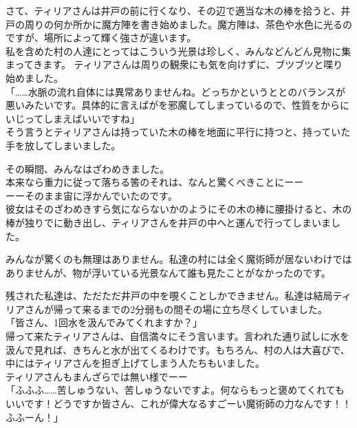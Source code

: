 \documentclass[oneside, a4paper]{jsbook}
\begin{document}
さて、ティリアさんは井戸の前に行くなり、その辺で適当な木の棒を拾うと、井戸の周りの何か所かに魔方陣を書き始めました。魔方陣は、茶色や水色に光るのですが、場所によって輝く強さが違います。\\
私を含めた村の人達にとってはこういう光景は珍しく、みんなどんどん見物に集まってきます。
ティリアさんは周りの観衆にも気を向けずに、ブツブツと喋り始めました。\\
  
 「……水脈の流れ自体には異常ありませんね。どっちかというととのバランスが悪いみたいです。具体的に言えばがを邪魔してしまっているので、性質をからにいじってしまえばいいですね」\\

そう言うとティリアさんは持っていた木の棒を地面に平行に持つと、持っていた手を放してしまいました。

その瞬間、みんなはざわめきました。\\
本来なら重力に従って落ちる筈のそれは、なんと驚くべきことにーー\\

ーーそのまま宙に浮かんでいたのです。\\

彼女はそのざわめきすら気にならないかのようにその木の棒に腰掛けると、木の棒が独りでに動き出し、ティリアさんを井戸の中へと運んで行ってしまいました。

みんなが驚くのも無理はありません。私達の村には全く魔術師が居ないわけではありませんが、物が浮いている光景なんて誰も見たことがなかったのです。

残された私達は、ただただ井戸の中を覗くことしかできません。私達は結局ティリアさんが帰って来るまでの2分弱もの間その場に立ち尽くしていました。\\

\noindent
「皆さん、1回水を汲んでみてくれますか？」\\

\noindent
帰って来たティリアさんは、自信満々にそう言います。言われた通り試しに水を汲んで見れば、きちんと水が出てくるわけです。もちろん、村の人は大喜びで、中にはティリアさんを担ぎ上げてしまう人たちもいました。\\

ティリアさんもまんざらでは無い様でーー\\

\noindent
「ふふふ……苦しゅうない、苦しゅうないですよ。何ならもっと褒めてくれてもいいです！どうですか皆さん、これが偉大なるすごーい魔術師の力なんです！！ふふーん！」\\
\end{document}
